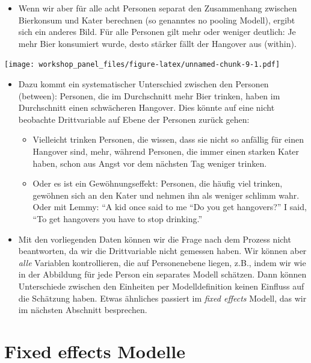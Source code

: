 \documentclass[]{book}
\providecommand{\tightlist}{%
  \setlength{\itemsep}{0pt}\setlength{\parskip}{0pt}}
\begin{document}
\begin{itemize}
\tightlist
\item
  Wenn wir aber für alle acht Personen separat den Zusammenhang zwischen Bierkonsum und Kater berechnen (so genanntes no pooling Modell), ergibt sich ein anderes Bild. Für alle Personen gilt mehr oder weniger deutlich: Je mehr Bier konsumiert wurde, desto stärker fällt der Hangover aus (within).
\end{itemize}

\texttt{[image: workshop\_panel\_files/figure-latex/unnamed-chunk-9-1.pdf]}

\begin{itemize}
\tightlist
\item
  Dazu kommt ein systematischer Unterschied zwischen den Personen (between): Personen, die im Durchschnitt mehr Bier trinken, haben im Durchschnitt einen schwächeren Hangover. Dies könnte auf eine nicht beobachte Drittvariable auf Ebene der Personen zurück gehen:

  \begin{itemize}
  \tightlist
  \item
    Vielleicht trinken Personen, die wissen, dass sie nicht so anfällig für einen Hangover sind, mehr, während Personen, die immer einen starken Kater haben, schon aus Angst vor dem nächsten Tag weniger trinken.
  \item
    Oder es ist ein Gewöhnungseffekt: Personen, die häufig viel trinken, gewöhnen sich an den Kater und nehmen ihn als weniger schlimm wahr. Oder mit Lemmy: ``A kid once said to me ``Do you get hangovers?'' I said, ``To get hangovers you have to stop drinking.''
  \end{itemize}
\item
  Mit den vorliegenden Daten können wir die Frage nach dem Prozess nicht beantworten, da wir die Drittvariable nicht gemessen haben. Wir können aber \emph{alle} Variablen kontrollieren, die auf Personenebene liegen, z.B., indem wir wie in der Abbildung für jede Person ein separates Modell schätzen. Dann können Unterschiede zwischen den Einheiten per Modelldefinition keinen Einfluss auf die Schätzung haben. Etwas ähnliches passiert im \emph{fixed effects} Modell, das wir im nächsten Abschnitt besprechen.
\end{itemize}

\hypertarget{fixed-effects-modelle}{%
\chapter{Fixed effects Modelle}\label{fixed-effects-modelle}}
\end{document}
